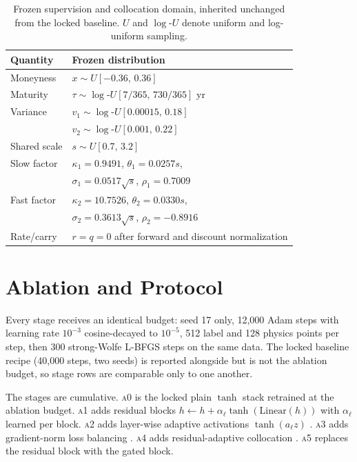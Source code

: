 \documentclass[conference]{IEEEtran}
\begin{document}
\begin{table}[!t]
\centering
\caption{Frozen supervision and collocation domain, inherited unchanged from
the locked baseline. $U$ and $\log$-$U$ denote uniform and log-uniform
sampling.}
\label{tab:domain}
\begin{tabular}{ll}
\toprule
Quantity & Frozen distribution \\
\midrule
Moneyness    & $x \sim U[-0.36,\,0.36]$ \\
Maturity     & $\tau \sim \log\text{-}U[7/365,\,730/365]$ yr \\
Variance     & $v_1 \sim \log\text{-}U[0.00015,\,0.18]$ \\
             & $v_2 \sim \log\text{-}U[0.001,\,0.22]$ \\
Shared scale & $s \sim U[0.7,\,3.2]$ \\
Slow factor  & $\kappa_1=0.9491$, $\theta_1=0.0257s$, \\
             & $\sigma_1=0.0517\sqrt{s}$, $\rho_1=0.7009$ \\
Fast factor  & $\kappa_2=10.7526$, $\theta_2=0.0330s$, \\
             & $\sigma_2=0.3613\sqrt{s}$, $\rho_2=-0.8916$ \\
Rate/carry   & $r=q=0$ after forward and discount normalization \\
\bottomrule
\end{tabular}
\end{table}

\section{Ablation and Protocol}

Every stage receives an identical budget: seed 17 only, 12,000 Adam steps with
learning rate $10^{-3}$ cosine-decayed to $10^{-5}$, 512 label and 128 physics
points per step, then 300 strong-Wolfe L-BFGS steps on the same data. The
locked baseline recipe (40,000 steps, two seeds) is reported alongside but is
not the ablation budget, so stage rows are comparable only to one another.

The stages are cumulative. \textsc{a0} is the locked plain $\tanh$ stack
retrained at the ablation budget. \textsc{a1} adds residual blocks
$h \leftarrow h + \alpha_\ell\tanh(\mathrm{Linear}(h))$ with $\alpha_\ell$
learned per block. \textsc{a2} adds layer-wise adaptive activations
$\tanh(a_\ell z)$ \cite{jagtap2020}. \textsc{a3} adds gradient-norm loss
balancing \cite{wang2021}. \textsc{a4} adds residual-adaptive collocation
\cite{wu2023}. \textsc{a5} replaces the residual block with the gated block.
\end{document}
